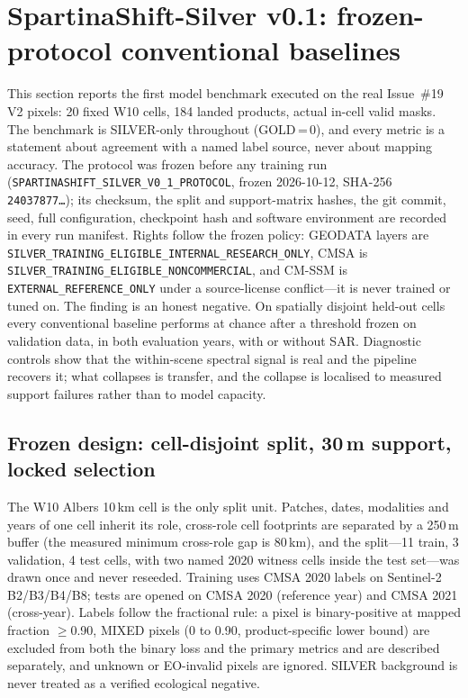 \section{SpartinaShift-Silver v0.1: frozen-protocol conventional baselines}\label{sec:silverbench}

This section reports the first model benchmark executed on the real
Issue~\#19 V2 pixels: 20 fixed W10 cells, 184 landed products, actual
in-cell valid masks. The benchmark is SILVER-only throughout (GOLD\,=\,0),
and every metric is a statement about agreement with a named label
source, never about mapping accuracy. The protocol was frozen before any
training run (\texttt{SPARTINASHIFT\_SILVER\_V0\_1\_PROTOCOL}, frozen
2026-10-12, SHA-256 \texttt{24037877\ldots}); its checksum, the split
and support-matrix hashes, the git commit, seed, full configuration,
checkpoint hash and software environment are recorded in every run
manifest. Rights follow the frozen policy: GEODATA layers are
\texttt{SILVER\_TRAINING\_ELIGIBLE\_INTERNAL\_RESEARCH\_ONLY}, CMSA is
\texttt{SILVER\_TRAINING\_ELIGIBLE\_NONCOMMERCIAL}, and CM-SSM is
\texttt{EXTERNAL\_REFERENCE\_ONLY} under a source-license conflict---it
is never trained or tuned on. The finding is an honest negative. On
spatially disjoint held-out cells every conventional baseline performs
at chance after a threshold frozen on validation data, in both
evaluation years, with or without SAR. Diagnostic controls show that the
within-scene spectral signal is real and the pipeline recovers it; what
collapses is transfer, and the collapse is localised to measured support
failures rather than to model capacity.

\subsection{Frozen design: cell-disjoint split, 30\,m support, locked selection}
The W10 Albers 10\,km cell is the only split unit. Patches, dates,
modalities and years of one cell inherit its role, cross-role cell
footprints are separated by a 250\,m buffer (the measured minimum
cross-role gap is 80\,km), and the split---11 train, 3 validation, 4
test cells, with two named 2020 witness cells inside the test set---was
drawn once and never reseeded. Training uses CMSA 2020 labels on
Sentinel-2 B2/B3/B4/B8; tests are opened on CMSA 2020 (reference year)
and CMSA 2021 (cross-year). Labels follow the fractional rule: a pixel
is binary-positive at mapped fraction $\geq$0.90, MIXED pixels (0 to
0.90, product-specific lower bound) are excluded from both the binary
loss and the primary metrics and are described separately, and unknown
or EO-invalid pixels are ignored. SILVER background is never treated as
a verified ecological negative.

